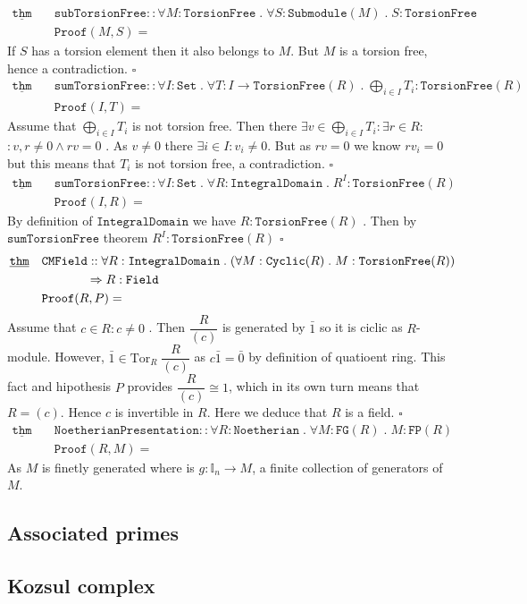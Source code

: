\documentclass[12pt]{article}
\newcommand{\tor}[1]{\mathrm{Tor}_{#1} \;}
\renewcommand{\.}{\; . \;}
\newcommand{\Thm}{\underline{\mathtt{thm}} \quad}
\newcommand{\submodule}[1]{\mathtt{Submodule}(#1)}
\newcommand{\field}{\mathtt{Field}}
\newcommand{\set}{\mathtt{Set}}
\newcommand{\intD}{\mathtt{IntegralDomain}}
\begin{document}
\newpage
\begin{align*}
\Thm & \mathtt{subTorsionFree} :: \forall M : \mathtt{TorsionFree} \. \forall S : \submodule{M} \. S : \mathtt{TorsionFree} \\
& \mathtt{Proof}(M,S) =
\end{align*}
If $S$ has a torsion element then it also belongs to $M$. But $M$ is a torsion free, hence a contradiction. $\square$
\begin{align*}
\Thm & \mathtt{sumTorsionFree} :: \forall I : \set \. \forall T : I \to \mathtt{TorsionFree}(R) \.  
\bigoplus_{i \in I} T_i : \mathtt{TorsionFree}(R) \\
& \mathtt{Proof}(I,T) =
\end{align*}
Assume  that $\bigoplus_{i \in I} T_i$ is not torsion free. Then there $\exists v \in \bigoplus_{i \in I} T_i : \exists r \in R  : $ \\ $:v,r \neq 0 \wedge rv = 0  $ . As $v \neq 0$ there $\exists i \in I : v_i \neq 0$. But as $rv = 0$ we know $rv_i = 0$ but this means that $T_i$ is not torsion free, a contradiction. $\square$
\begin{align*}
\Thm & \mathtt{sumTorsionFree} :: \forall I : \set \. \forall R : \intD \. R^I : \mathtt{TorsionFree}(R) \\
& \mathtt{Proof}(I, R) =
\end{align*}
 By definition of $\intD$ we have  $R : \mathtt{TorsionFree}(R)$ . Then by  $\mathtt{sumTorsionFree}$ theorem
 $ R^I : \mathtt{TorsionFree}(R) $ $\square$
\begin{align*}
\Thm & \mathtt{CMField} :: \forall R : \intD \. (\forall M : \mathtt{Cyclic}(R) \. M : 
 \mathtt{TorsionFree}(R)) \\
  & \kern 3pc \Rightarrow R : \field \\
& \mathtt{Proof}(R, P) = 
\end{align*}
Assume that $c \in R : c \neq 0$ . Then $\dfrac{R}{(c)}$ is generated by $\bar 1$ so it is ciclic as $R$-module. However, $\bar 1 \in \tor{R}{\dfrac{R}{(c)}}$ as $c \bar 1 = \bar 0$ by definition of quatioent ring. This fact and hipothesis $P$ provides  $\dfrac{R}{(c)} \cong 1 $, which in its own turn means that $R = (c)$. Hence $c$ is invertible in $R$. Here we deduce that $R$ is a field. $\square$
\begin{align*}
\Thm & \mathtt{NoetherianPresentation} :: \forall R : \mathtt{Noetherian} \. \forall M : \mathtt{FG}(R) \. 
  M : \mathtt{FP}(R) \\
& \mathtt{Proof}(R,M) = 
\end{align*}
As $M$ is finetly generated where is  $g : \mathbb{I}_n \to M$,  a finite collection of generators of $M$. \newpage
\subsection{Associated primes}
\subsection{Kozsul complex}
\end{document}
